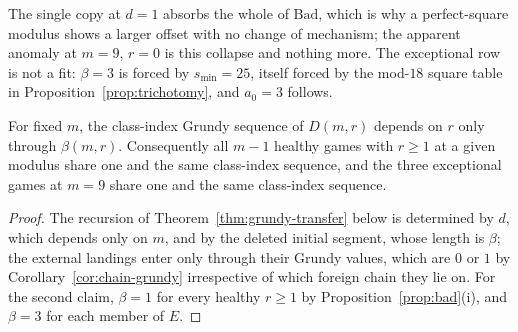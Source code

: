 The single copy at $d = 1$ absorbs the whole of $\mathrm{Bad}$, which is
why a perfect-square modulus shows a larger offset with no change of
mechanism; the apparent anomaly at $m = 9$, $r = 0$ is this collapse and
nothing more. The exceptional row is not a fit: $\beta = 3$ is forced by
$s_{\min} = 25$, itself forced by the mod-$18$ square table in
Proposition~\ref{prop:trichotomy}, and $a_0 = 3$ follows.

\begin{corollary}\label{cor:r-beta}
For fixed $m$, the class-index Grundy sequence of $D(m,r)$ depends on $r$
only through $\beta(m,r)$. Consequently all $m-1$ healthy games with
$r \ge 1$ at a given modulus share one and the same class-index sequence,
and the three exceptional games at $m = 9$ share one and the same
class-index sequence.
\end{corollary}
\begin{proof}
The recursion of Theorem~\ref{thm:grundy-transfer} below is determined by
$d$, which depends only on $m$, and by the deleted initial segment, whose
length is $\beta$; the external landings enter only through their Grundy
values, which are $0$ or $1$ by Corollary~\ref{cor:chain-grundy}
irrespective of which foreign chain they lie on. For the second claim,
$\beta = 1$ for every healthy $r \ge 1$ by
Proposition~\ref{prop:bad}(i), and $\beta = 3$ for each member of $E$.
\end{proof}

